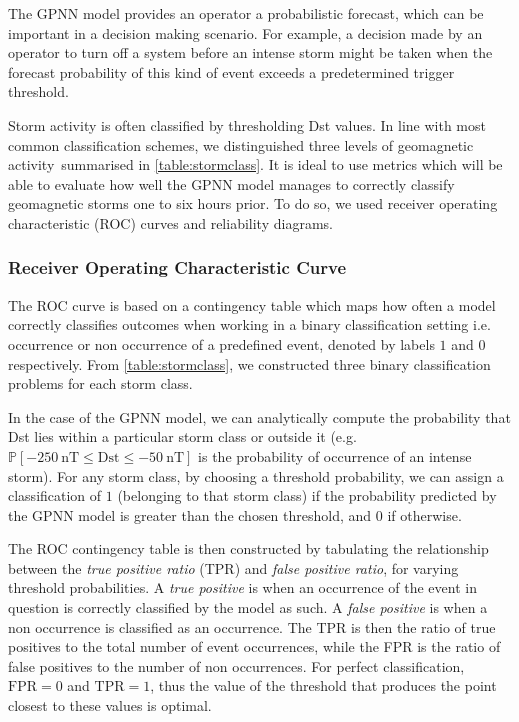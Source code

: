 The GPNN model provides an operator a probabilistic forecast, which can be important in a decision making scenario. 
For example, a decision made by an operator to turn off a system before an intense storm might be taken 
when the forecast probability of this kind of event exceeds a predetermined trigger threshold.

Storm activity is often classified by thresholding Dst values. In line with most common classification schemes, 
we distinguished three levels of geomagnetic activity summarised in \cref{table:stormclass}. It is ideal to 
use metrics which will be able to evaluate how well the GPNN model manages to correctly classify geomagnetic 
storms one to six hours prior. To do so, we used receiver operating characteristic (ROC) curves and 
reliability diagrams.



\subsubsection{Receiver Operating Characteristic Curve}

The ROC curve is based on a contingency table which maps how often a model correctly classifies outcomes when 
working in a binary classification setting i.e. occurrence or non occurrence of a predefined event, denoted by labels 
$1$ and $0$ respectively. From \cref{table:stormclass}, we constructed three binary classification problems 
for each storm class.

In the case of the GPNN model, we can analytically compute the probability that Dst lies within a particular storm class 
or outside it (e.g. $\mathbb{P}[\SI{-250}{\nano\tesla} \leq \mathrm{Dst} \leq \SI{-50}{\nano\tesla}]$ is the probability 
of occurrence of an intense storm). For any storm class, by choosing a threshold probability, we can assign a 
classification of $1$ (belonging to that storm class) if the probability predicted by the GPNN model is greater 
than the chosen threshold, and $0$ if otherwise. 

The ROC contingency table is then constructed by tabulating the relationship between the 
\emph{true positive ratio} (TPR) and \emph{false positive ratio}, for varying threshold probabilities. 
A \emph{true positive} is when an occurrence of the event in question is correctly classified by the model as such. 
A \emph{false positive} is when a non occurrence is classified as an occurrence. The TPR is then the ratio of 
true positives to the total number of event occurrences, while the FPR is the ratio of false positives to the 
number of non occurrences. For perfect classification, $\mathrm{FPR} = 0$ and $\mathrm{TPR} = 1$, thus 
the value of the threshold that produces the point closest to these values is optimal.  

